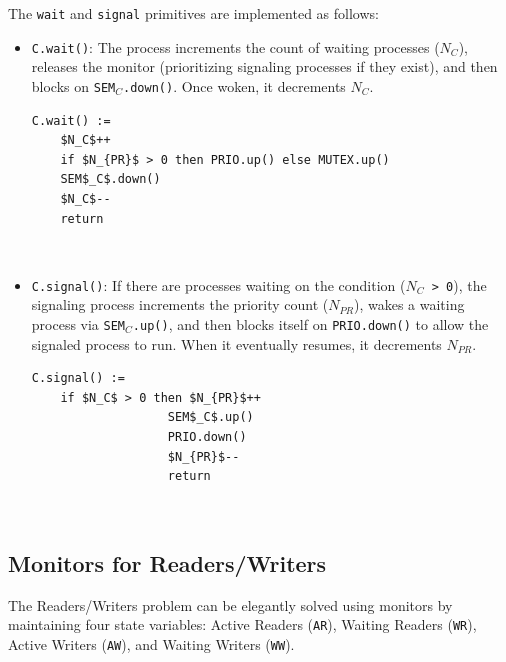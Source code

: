 The \texttt{wait} and \texttt{signal} primitives are implemented as follows:
\begin{itemize}
    \item \texttt{C.wait()}: The process increments the count of waiting processes (\texttt{$N_C$}), releases the monitor (prioritizing signaling processes if they exist), and then blocks on \texttt{SEM}$_C$\texttt{.down()}. Once woken, it decrements \texttt{$N_C$}.

\begin{minipage}{\textwidth}
\begin{lstlisting}[mathescape]
C.wait() :=
    $N_C$++
    if $N_{PR}$ > 0 then PRIO.up() else MUTEX.up()
    SEM$_C$.down()
    $N_C$--
    return
\end{lstlisting}
\end{minipage}\\

    \item \texttt{C.signal()}: If there are processes waiting on the condition (\texttt{$N_C$ > 0}), the signaling process increments the priority count (\texttt{$N_{PR}$}), wakes a waiting process via \texttt{SEM}$_C$\texttt{.up()}, and then blocks itself on \texttt{PRIO.down()} to allow the signaled process to run. When it eventually resumes, it decrements \texttt{$N_{PR}$}.

\begin{minipage}{\textwidth}
\begin{lstlisting}[mathescape]
C.signal() :=
    if $N_C$ > 0 then $N_{PR}$++
                   SEM$_C$.up()
                   PRIO.down()
                   $N_{PR}$--
                   return
\end{lstlisting}
\end{minipage}\\
\end{itemize}

\subsection{Monitors for Readers/Writers}
The Readers/Writers problem can be elegantly solved using monitors by maintaining four state variables: Active Readers (\texttt{AR}), Waiting Readers (\texttt{WR}), Active Writers (\texttt{AW}), and Waiting Writers (\texttt{WW}).

